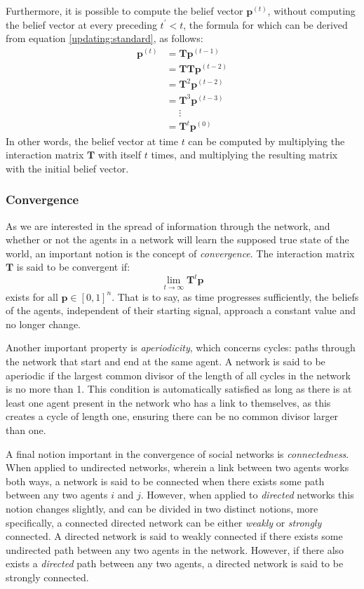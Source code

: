 \documentclass{article}
\newcommand{\T}{\textbf{T}}
\begin{document}
Furthermore, it is possible to compute the belief vector $\textbf{p}^{(t)}$, without computing the belief vector at every preceding $t^\prime < t$, the formula for which can be derived from equation \ref{updating:standard}, as follows:
\begin{align*}
    \textbf{p}^{(t)} &= \T\textbf{p}^{(t-1)} \\
    &= \T\T\textbf{p}^{(t-2)}\\
    &= \T^2\textbf{p}^{(t-2)}\\
    &= \T^3\textbf{p}^{(t-3)} \\
    & \ \ \ \ \ \  \vdots \\
    &= \T^{t}\textbf{p}^{(0)}
\end{align*}
In other words, the belief vector at time $t$ can be computed by multiplying the interaction matrix $\T$ with itself $t$ times, and multiplying the resulting matrix with the initial belief vector.
\newpage

\subsubsection{Convergence}
\label{convergence}
As we are interested in the spread of information through the network, and whether or not the agents in a network will learn the supposed true state of the world, an important notion is the concept of \emph{convergence}. The interaction matrix $\T$ is said to be convergent if:
\begin{equation*}
    \lim_{t\to\infty} \T^t\textbf{p}
\end{equation*}
exists for all $\textbf{p} \in [0, 1]^n$. That is to say, as time progresses sufficiently, the beliefs of the agents, independent of their starting signal, approach a constant value and no longer change.

Another important property is \emph{aperiodicity}, which concerns cycles: paths through the network that start and end at the same agent. A network is said to be aperiodic if the largest common divisor of the length of all cycles in the network is no more than 1. This condition is automatically satisfied as long as there is at least one agent present in the network who has a link to themselves, as this creates a cycle of length one, ensuring there can be no common divisor larger than one.

A final notion important in the convergence of social networks is \emph{connectedness}. When applied to undirected networks, wherein a link between two agents works both ways, a network is said to be connected when there exists some path between any two agents $i$ and $j$. However, when applied to \emph{directed} networks this notion changes slightly, and can be divided in two distinct notions, more specifically, a connected directed network can be either \emph{weakly} or \emph{strongly} connected. A directed network is said to weakly connected if there exists some undirected path between any two agents in the network. However, if there also exists a \emph{directed} path between any two agents, a directed network is said to be strongly connected.
\end{document}
